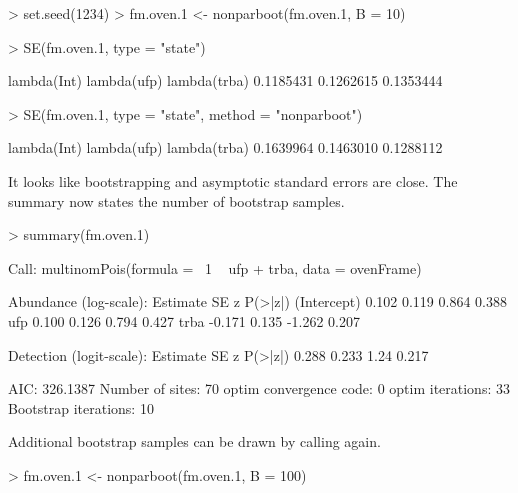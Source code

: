 \documentclass[article,shortnames]{jss}
\begin{document}
\begin{Schunk}
\begin{Sinput}
> set.seed(1234)
> fm.oven.1 <- nonparboot(fm.oven.1, B = 10)
\end{Sinput}
\end{Schunk}

\begin{Schunk}
\begin{Sinput}
> SE(fm.oven.1, type = "state")
\end{Sinput}
\begin{Soutput}
 lambda(Int)  lambda(ufp) lambda(trba) 
   0.1185431    0.1262615    0.1353444 
\end{Soutput}
\begin{Sinput}
> SE(fm.oven.1, type = "state", method = "nonparboot")
\end{Sinput}
\begin{Soutput}
 lambda(Int)  lambda(ufp) lambda(trba) 
   0.1639964    0.1463010    0.1288112 
\end{Soutput}
\end{Schunk}

It looks like bootstrapping and asymptotic standard errors are close.
The summary now states the number of bootstrap samples.

\begin{Schunk}
\begin{Sinput}
> summary(fm.oven.1)
\end{Sinput}
\begin{Soutput}
Call:
multinomPois(formula = ~1 ~ ufp + trba, data = ovenFrame)

Abundance (log-scale):
            Estimate    SE      z P(>|z|)
(Intercept)    0.102 0.119  0.864   0.388
ufp            0.100 0.126  0.794   0.427
trba          -0.171 0.135 -1.262   0.207

Detection (logit-scale):
 Estimate    SE    z P(>|z|)
    0.288 0.233 1.24   0.217

AIC: 326.1387 
Number of sites: 70
optim convergence code: 0
optim iterations: 33 
Bootstrap iterations: 10 
\end{Soutput}
\end{Schunk}

Additional bootstrap samples can be drawn by calling  again.
\begin{Schunk}
\begin{Sinput}
> fm.oven.1 <- nonparboot(fm.oven.1, B = 100)
\end{Sinput}
\end{Schunk}
\end{document}

